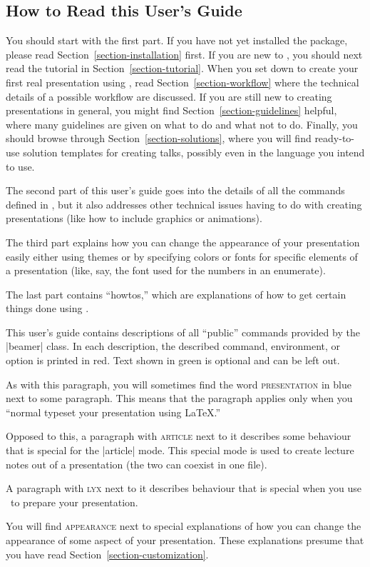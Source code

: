 \subsection{How to Read this User's Guide}

You should start with the first part. If you have not yet installed
the package, please read Section~\ref{section-installation} first. If 
you are new to \beamer, you should next read the tutorial in
Section~\ref{section-tutorial}. When you set down to create your first
real presentation using \beamer, read Section~\ref{section-workflow}
where the technical details of a possible workflow are
discussed. If you are still new to creating presentations in general, you
might find Section~\ref{section-guidelines} helpful, where many
guidelines are given on what to do and what not to do. Finally, you
should browse through Section~\ref{section-solutions}, where you will
find ready-to-use solution templates for creating talks, possibly even
in the language you intend to use.

The second part of this user's guide goes into the details of all the
commands defined in \beamer, but it also addresses  other technical
issues having to do with creating presentations (like how to include
graphics or animations).

The third part explains how you can change the appearance of your
presentation easily either using themes or by specifying colors or
fonts for specific elements of a presentation (like, say, the font
used for the numbers in an enumerate). 

The last part contains ``howtos,'' which are explanations of how to
get certain things done using \beamer.

\medskip
\noindent
This user's guide contains descriptions of all ``public''
commands provided by the |beamer| class. In each description, the
described command, environment, or option is printed in red. Text
shown in green is optional and can be left out.

\beamernote
As with this paragraph, you will sometimes find the word
\textsc{presentation} in blue next to some paragraph. This means that
the paragraph applies only when you ``normal typeset your presentation
using \LaTeX.''

\articlenote
Opposed to this, a paragraph with \textsc{article} next to it
describes some behaviour that is special for the |article| mode. This
special mode is used to create lecture notes out of a presentation
(the two can coexist in one file).

\lyxnote
A paragraph with \textsc{lyx} next to it describes behaviour that is
special when you use \LyX\ to prepare your presentation.

\appearancenote
You will find \textsc{appearance} next to special explanations of how
you can change the appearance of some aspect of your
presentation. These explanations presume that you have read
Section~\ref{section-customization}.



